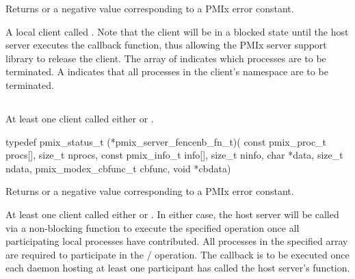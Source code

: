 Returns  or a negative value corresponding to a PMIx error constant.

\descr

A local client called .
Note that the client will be in a blocked state until the host server executes the callback function, thus allowing the PMIx server support library to release the client.
The array of  indicates which processes are to be terminated.
A  indicates that all processes in the client's namespace are to be terminated.


\subsection{}

\summary

At least one client called either  or .

\format

\cspecificstart
\begin{codepar}
typedef pmix_status_t (*pmix_server_fencenb_fn_t)(
                             const pmix_proc_t procs[], size_t nprocs,
                             const pmix_info_t info[], size_t ninfo,
                             char *data, size_t ndata,
                             pmix_modex_cbfunc_t cbfunc, void *cbdata)
\end{codepar}
\cspecificend

\begin{arglist}
\end{arglist}

Returns  or a negative value corresponding to a PMIx error constant.

\descr

At least one client called either  or .
In either case, the host server will be called via a non-blocking function to execute the specified operation once all participating local processes have contributed.
All processes in the specified  array are required to participate in the / operation.
The callback is to be executed once each daemon hosting at least one participant has called the host server's  function.

